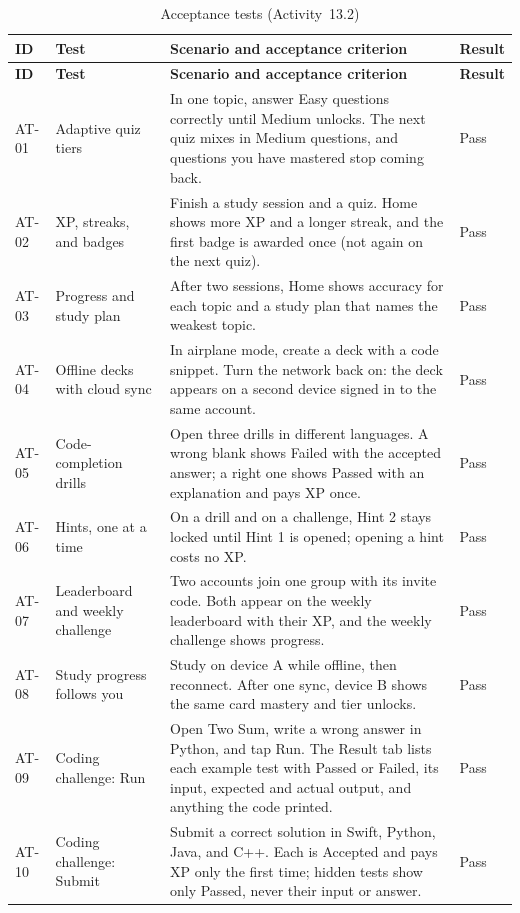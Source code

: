 \documentclass[12pt,letterpaper]{article}
\begin{document}
\begin{xltabular}{\textwidth}{@{}L{1.0cm} L{3.0cm} Y L{2.0cm}@{}}
\caption{Acceptance tests (Activity~13.2)}\label{tab:accept}\\
\toprule
\textbf{ID} & \textbf{Test} & \textbf{Scenario and acceptance criterion} & \textbf{Result} \\
\midrule
\endfirsthead
\toprule
\textbf{ID} & \textbf{Test} & \textbf{Scenario and acceptance criterion} & \textbf{Result} \\
\midrule
\endhead
\bottomrule
\endfoot
AT-01 & Adaptive quiz tiers & In one topic, answer Easy questions correctly until Medium unlocks. The next quiz mixes in Medium questions, and questions you have mastered stop coming back. & Pass \\
AT-02 & XP, streaks, and badges & Finish a study session and a quiz. Home shows more XP and a longer streak, and the first badge is awarded once (not again on the next quiz). & Pass \\
AT-03 & Progress and study plan & After two sessions, Home shows accuracy for each topic and a study plan that names the weakest topic. & Pass \\
AT-04 & Offline decks with cloud sync & In airplane mode, create a deck with a code snippet. Turn the network back on: the deck appears on a second device signed in to the same account. & Pass \\
AT-05 & Code-completion drills & Open three drills in different languages. A wrong blank shows Failed with the accepted answer; a right one shows Passed with an explanation and pays XP once. & Pass \\
AT-06 & Hints, one at a time & On a drill and on a challenge, Hint 2 stays locked until Hint 1 is opened; opening a hint costs no XP. & Pass \\
AT-07 & Leaderboard and weekly challenge & Two accounts join one group with its invite code. Both appear on the weekly leaderboard with their XP, and the weekly challenge shows progress. & Pass \\
AT-08 & Study progress follows you & Study on device A while offline, then reconnect. After one sync, device B shows the same card mastery and tier unlocks. & Pass \\
AT-09 & Coding challenge: Run & Open Two Sum, write a wrong answer in Python, and tap Run. The Result tab lists each example test with Passed or Failed, its input, expected and actual output, and anything the code printed. & Pass \\
AT-10 & Coding challenge: Submit & Submit a correct solution in Swift, Python, Java, and C++. Each is Accepted and pays XP only the first time; hidden tests show only Passed, never their input or answer. & Pass \\

\end{xltabular}
\end{document}
